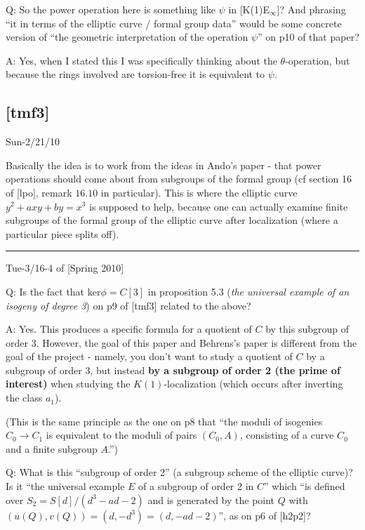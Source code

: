 \documentclass{rs}
\theoremstyle{definition}
\theoremstyle{remark}
\renewcommand{\=}{\approx}
\renewcommand{\-}{\sim}
\numberwithin{equation}{section}
\numberwithin{thm}{section}
\begin{document}
Q: So the power operation here is something like $\psi$ in [K(1)E$_\infty$]? 
And phrasing ``it in terms of the elliptic curve / formal group data'' would be some concrete version of 
``the geometric interpretation of the operation $\psi$'' on p10 of that paper?

A: Yes, when I stated this I was specifically thinking about the $\theta$-operation, 
but because the rings involved are torsion-free it is equivalent to $\psi$.


\newpage
\subsection{[tmf3]}
\label{subsec:tmf3}

Sun-2/21/10

Basically the idea is to work from the ideas in Ando's paper - that power operations should come about from subgroups of the formal group 
(cf section 16 of [lpo], remark $16.10$ in particular). 
This is where the elliptic curve  $y^2 + axy + by = x^3$ is supposed to help, 
because one can actually examine finite subgroups of the formal group of the elliptic curve after localization 
(where a particular piece splits off).\\

\hrule

Tue-3/16-4 of [Spring 2010]

Q: Is the fact that ker$\phi = C[3]$ in proposition 5.3 (\textit{the universal example of an isogeny of degree 3}) on p9 of [tmf3] related to the above?

A: Yes. This produces a specific formula for a quotient of $C$ by this subgroup of order 3. 
However, the goal of this paper and Behrens's paper is different from the goal of the project - 
namely, you don't want to study a quotient of $C$ by a subgroup of order 3, but instead \textbf{by a subgroup of order 2 (the prime of interest)} 
when studying the $K(1)$-localization (which occurs after inverting the class $a_1$).

(This is the same principle as the one on p8 that ``the moduli of isogenies $C_0 \rightarrow C_1$ is equivalent to the moduli of pairs 
$(C_0,A)$, consisting of a curve $C_0$ and a finite subgroup $A$.'')

Q: What is this ``subgroup of order 2'' (a subgroup scheme of the elliptic
curve)? Is it ``the universal example $E$ of a subgroup of order 2 in $C$'' 
which ``is defined over $S_2 = S[d]/(d^3-ad-2)$ and is generated by the point $Q$ with 
$(u(Q), v(Q)) = (d, -d^3) = (d, -ad-2)$'', as on p6 of [h2p2]?
\end{document}
